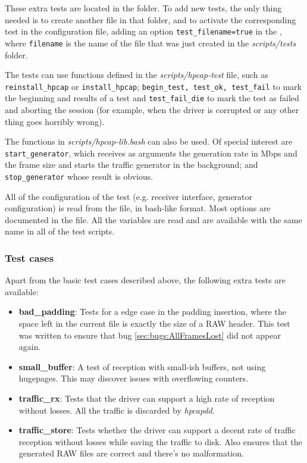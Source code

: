 \documentclass[oneside]{hpman}
\begin{document}
These extra tests are located in the  folder. To add new tests, the only thing needed is to create another file in that folder, and to activate the corresponding test in the configuration file, adding an option \texttt{test\_filename=true} in the , where \texttt{filename} is the name of the file that was just created in the \textit{scripts/tests} folder.

The tests can use functions defined in the \textit{scripts/hpcap-test} file, such as \texttt{reinstall\_hpcap} or \texttt{install\_hpcap}; \texttt{begin\_test, test\_ok, test\_fail} to mark the beginning and results of a test and \texttt{test\_fail\_die} to mark the test as failed and aborting the session (for example, when the driver is corrupted or any other thing goes horribly wrong).

The functions in \textit{scripts/hpcap-lib.bash} can also be used. Of special interest are \texttt{start\_generator}, which receives as arguments the generation rate in Mbps and the frame size and starts the traffic generator in the background; and \texttt{stop\_generator} whose result is obvious.

All of the configuration of the test (e.g. receiver interface, generator configuration) is read from the  file, in bash-like format. Most options are documented in the file. All the variables are read and are available with the same name in all of the test scripts.

\subsubsection{Test cases}

Apart from the basic test cases described above, the following extra tests are available:

\begin{itemize}
\item \textbf{bad\_padding}: Tests for a edge case in the padding insertion, where the space left in the current file is exactly the size of a RAW header. This test was written to ensure that bug \ref{sec:bugs:AllFramesLost} did not appear again.
\item \textbf{small\_buffer}: A test of reception with small-ish buffers, not using hugepages. This may discover issues with overflowing counters.
\item \textbf{traffic\_rx}: Tests that the driver can support a high rate of reception without losses. All the traffic is discarded by \textit{hpcapdd}.
\item \textbf{traffic\_store}: Tests whether the driver can support a decent rate of traffic reception without losses while saving the traffic to disk. Also ensures that the generated RAW files are correct and there's no malformation.
\end{itemize}
\end{document}
